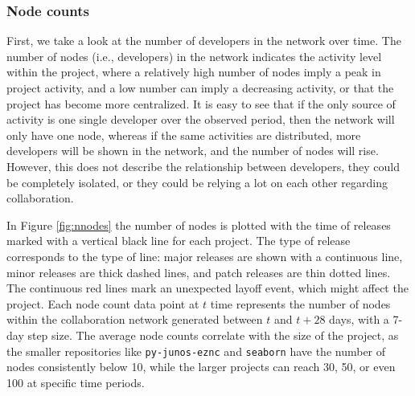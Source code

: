 \subsubsection{Node counts}

First, we take a look at the number of developers in the network over time. The number of nodes (i.e., developers) in the network indicates the activity level within the project, where a relatively high number of nodes imply a peak in project activity, and a low number can imply a decreasing activity, or that the project has become more centralized. It is easy to see that if the only source of activity is one single developer over the observed period, then the network will only have one node, whereas if the same activities are distributed, more developers will be shown in the network, and the number of nodes will rise. However, this does not describe the relationship between developers, they could be completely isolated, or they could be relying a lot on each other regarding collaboration.

In Figure \ref{fig:nnodes} the number of nodes is plotted with the time of releases marked with a vertical black line for each project. The type of release corresponds to the type of line: major releases are shown with a continuous line, minor releases are thick dashed lines, and patch releases are thin dotted lines. The continuous red lines mark an unexpected layoff event, which might affect the project. Each node count data point at $t$ time represents the number of nodes within the collaboration network generated between $t$ and $t+28$ days, with a 7-day step size. The average node counts correlate with the size of the project, as the smaller repositories like \texttt{py-junos-eznc} and \texttt{seaborn} have the number of nodes consistently below 10, while the larger projects can reach 30, 50, or even 100 at specific time periods.

